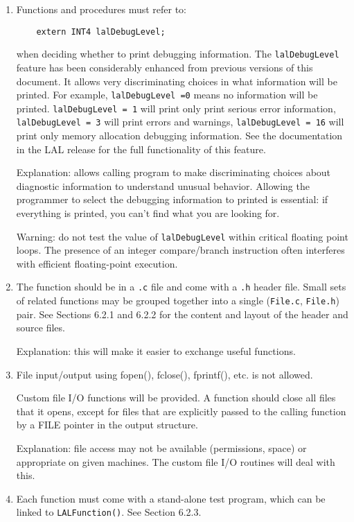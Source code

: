 \documentclass[]{ligodcc}
\begin{document}
\begin{enumerate}
\item
Functions and procedures must refer to: 
{\footnotesize
\begin{verbatim}
    extern INT4 lalDebugLevel;
\end{verbatim}}
when deciding whether to print debugging information. The
{\tt lalDebugLevel}  feature has been considerably enhanced from previous
versions of this document.  It allows very discriminating choices in
what information will be printed. For example, {\tt lalDebugLevel =0} means
no information will be printed. {\tt lalDebugLevel = 1} will print only
print serious error information, {\tt lalDebugLevel = 3} will print
errors and warnings, {\tt lalDebugLevel = 16} will print only memory
allocation debugging information. See the documentation in the LAL
release for the full functionality of this feature. 

Explanation: allows calling program to make discriminating choices
about diagnostic information to understand unusual behavior. Allowing
the programmer to  select the debugging information to printed is
essential: if everything is printed, you can't  find what you are
looking for. 

Warning: do not test the value of {\tt lalDebugLevel} within critical
floating point loops. The presence of an integer compare/branch
instruction often interferes with efficient floating-point execution.

\item
The function should be in a {\tt .c} file and come with a {\tt .h} header
file.  Small sets of related functions may be grouped together into a
single ({\tt File.c}, {\tt File.h}) pair.  See Sections  6.2.1 and 6.2.2 for the
content and layout of the header and source files.

Explanation: this will make it easier to exchange useful functions. 

\item
File input/output using fopen(), fclose(), fprintf(), etc. is
not allowed. 

Custom file I/O functions will be provided. A function should close
all files that it opens, except for files that are explicitly passed
to the calling function by a FILE pointer in the output structure.

Explanation: file access may not be available (permissions, space) or
appropriate on given machines. The custom file I/O routines will deal
with this.

\item
Each function must come with a stand-alone test program, which
can be linked to {\tt LALFunction()}.  See Section 6.2.3. 


\end{enumerate}
\end{document}

